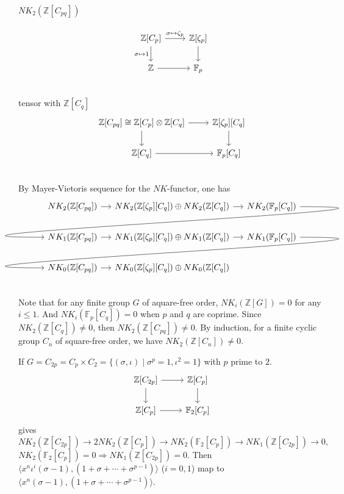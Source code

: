 \paragraph{$NK_2(\mathbb{Z}[C_{pq}])$}
\[\begin{tikzcd}
			\mathbb{Z}[C_p] \ar[r,"\sigma \mapsto \zeta_p"] \ar[d,"\sigma\mapsto 1"']& \mathbb{Z}[\zeta_p]\ar[d]\\
			\mathbb{Z} \ar[r] & \mathbb{F}_p\\
		\end{tikzcd}\]
tensor with $\mathbb{Z}[C_q]$
\[\begin{tikzcd}
	\mathbb{Z}[C_{pq}]\cong	\mathbb{Z}[C_p] \otimes \mathbb{Z}[C_q] \ar[r] \ar[d]& \mathbb{Z}[\zeta_p][C_q]\ar [d]\\
		 \mathbb{Z}[C_q]\ar[r] & \mathbb{F}_p[C_q]\\
	\end{tikzcd}\]
 By Mayer-Vietoris sequence for the $NK$-functor, one has
    \[\begin{tikzcd}[column sep=small]
		 NK_2(\mathbb{Z}[C_{pq}]) \ar[r] & NK_2(\mathbb{Z}[\zeta_p][C_q]) \oplus NK_2(\mathbb{Z}[C_q]) \ar[r] & NK_2(\mathbb{F}_p[C_q]) \ar[out=0, in=180, looseness=2, overlay]{dll}   \\
		  NK_1(\mathbb{Z}[C_{pq}]) \ar[r]  & NK_1(\mathbb{Z}[\zeta_p][C_q]) \oplus NK_1(\mathbb{Z}[C_q]) \ar[r]& NK_1(\mathbb{F}_p[C_q])  \ar[out=0, in=180, looseness=2, overlay]{dll}   \\
		 NK_0(\mathbb{Z}[C_{pq}]) \ar[r]  & NK_0(\mathbb{Z}[\zeta_p][C_q]) \oplus NK_0(\mathbb{Z}[C_q])  \\
	\end{tikzcd}\]
Note that for any finite group $G$ of aquare-free order, $NK_i(\mathbb{Z}[G])=0$ for any $i\leq 1$. And $NK_i(\mathbb{F}_p[C_q])=0$ when $p$ and $q$ are coprime. Since $NK_2(\mathbb{Z}[C_q])\neq 0$, then $NK_2(\mathbb{Z}[C_{pq}])\neq 0$. By induction, for a finite cyclic group $C_n$ of square-free order, we have $NK_2(\mathbb{Z}[C_n])\neq 0$.

If $G=C_{2p}=C_p\times C_2=\{(\sigma,\iota)\mid \sigma^p=1,\iota^2=1\}$ with $p$ prime to $2$.
\[\begin{tikzcd}
		\mathbb{Z}[C_{2p}] \ar[r] \ar[d]& \mathbb{Z}[C_{p}]\ar[d]\\
		 \mathbb{Z}[C_p]\ar[r] & \mathbb{F}_2[C_p]
	\end{tikzcd}\]
gives 
\[NK_2(\mathbb{Z}[C_{2p}])\longrightarrow 2NK_2(\mathbb{Z}[C_p])\longrightarrow NK_2(\mathbb{F}_2[C_p])\longrightarrow NK_1(\mathbb{Z}[C_{2p}])\longrightarrow 0,\]
$NK_2(\mathbb{F}_2[C_p])=0\Longrightarrow NK_1(\mathbb{Z}[C_{2p}])=0$. Then $\langle x^n \iota^i(\sigma-1),(1+\sigma+\cdots+\sigma^{p-1})\rangle$ ($i=0,1$) map to $\langle x^n(\sigma-1),(1+\sigma+\cdots+\sigma^{p-1})\rangle$.

